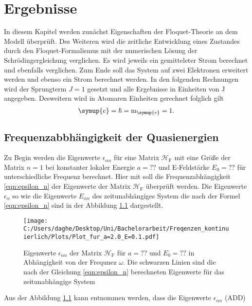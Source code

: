 \chapter{Ergebnisse}
In diesem Kapitel werden zunächst
Eigenschaften der Floquet-Theorie an dem Modell überprüft.
Des Weiteren wird die zeitliche Entwicklung
eines Zustandes durch den
Floquet-Formalismus mit der numerischen Lösung der
Schrödingergleichung verglichen. Es wird jeweils ein gemitteleter Strom berechnet und
ebenfalls verglichen.
Zum Ende soll das System auf zwei Elektronen erweitert werden und ebenso ein Strom berechnet werden.
In den folgenden Rechnungen wird der Sprungterm $J=1$ gesetzt und  alle Ergebnisse in Einheiten von J angegeben.
Desweitern wird in Atomaren Einheiten gerechnet folglich gilt
\begin{align}
   \symup{e}=\hbar=\text{m}_\symup{e}=1.
\end{align}
\section{Frequenzabbhängigkeit der Quasienergien}
Zu Begin werden die Eigenwerte $\epsilon_{\alpha n}$ für eine Matrix $\mathcal{H}_\mathrm{F}$ mit eine Größe der Matrix $n=1$
bei konstanter lokaler Energie $a=??$ und E-Feldstärke $E_0=??$ für unterschiedliche Frequenz berechnet.
Hier mit soll die Frequenzabhängigkeit \eqref{eqn:epsilon_n} der Eigenwerte der Matrix $\mathcal{H}_\mathrm{F}$
überprüft werden.
Die Eigenwerte $\epsilon_\alpha$ so wie die Eigenwerte $E_{\alpha n}$ des zeitunabhängiges System
die nach der Formel \eqref{eqn:epsilon_n}
sind in der Abbildung \ref{fig:epsilon_f} dargestellt.
\begin{figure}
   \centering
   \texttt{[image: C:/Users/daghe/Desktop/Uni/Bachelorarbeit/Freqenzen\_kontinuierlich/Plots/Plot\_fur\_a=2.0\_E=0.1.pdf]}
   \caption{Eigenwerte $\epsilon_{\alpha n}$ der Matrix $\mathcal{H}_\mathrm{F}$ für $a=??$ und $E_0=??$ in Abhängigkeit von der Frequnez $\omega$.
    Die schwarzen Linien sind die nach der Gleichung \eqref{eqn:epsilon_n} berechneten Eigenwerte für das zeitunabhängige System}
   \label{fig:epsilon_f}
\end{figure}
Aus der Abbildung \ref{fig:epsilon_f} kann entnommen werden, dass die Eigenwerte $\epsilon_{\alpha n}$
(ADD)
